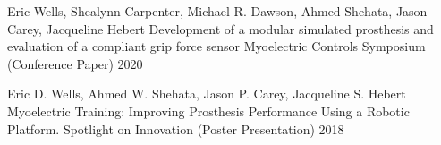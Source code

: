 
\begin{cventries}

  \cventry
    {Eric Wells, Shealynn Carpenter, Michael
    R. Dawson, Ahmed Shehata, Jason Carey, Jacqueline Hebert} %
    {Development of a modular simulated prosthesis and
    evaluation of a compliant grip force sensor} %
    {Myoelectric Controls Symposium (Conference Paper)} %
    {2020} %
    {}

  \cventry
    {Eric D. Wells, Ahmed W. Shehata, Jason P. Carey,
    Jacqueline S. Hebert} %
    {Myoelectric Training: Improving
    Prosthesis Performance Using a Robotic Platform.} %
    {Spotlight on Innovation (Poster Presentation)} %
    {2018} %
    {}

\end{cventries}
